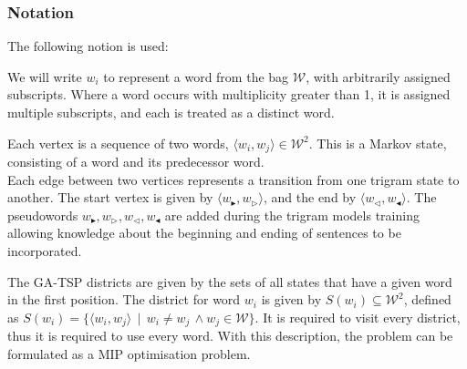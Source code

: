 \documentclass[twocolumn]{article}
\begin{document}
\renewcommand{\s}{w_{\blacktriangleright}}
\renewcommand{\ss}{w_{\triangleright}}
\newcommand{\e}{w_{\triangleleft}}
\newcommand{\ee}{w_{\blacktriangleleft}}
\newcommand{\W}{\mathcal{W}}

\newcommand{\displayunskip}{\vspace{0pt}}

\subsubsection{Notation}

The following notion is used:

We will write $w_{i}$ to represent a word from the bag \textbf{$\W$}, with
arbitrarily assigned subscripts. Where a word occurs with multiplicity
greater than 1, it is assigned multiple subscripts, and each is treated
as a distinct word.

Each vertex is a sequence of two words, $\langle w_{i},w_{j}\rangle\in\W^{2}$.
This is a Markov state, consisting of a word and its predecessor word. \\
Each edge between two vertices represents a transition from one trigram state to another.
The start vertex is given by $\langle\s,\ss\rangle$, and the end by $\langle\e,\ee\rangle$. The pseudowords  $\s,\ss,\e,\ee$ are added during the trigram models training allowing knowledge about the beginning and ending of sentences to be incorporated.

The GA-TSP districts are given by the sets of all states that have
a given word in the first position. The district for word $w_{i}$
is given by $S(w_{i})\subseteq\W^{2}$, defined as $S(w_{i})=\{\langle w_{i},w_{j}\rangle\,\mid\,w_{i}\ne w_{j}\,\wedge w_{j}\in\W\}$. It is required to visit every district, thus it is required to use every word.
With this description, the problem can be formulated as a MIP optimisation problem.
\end{document}
